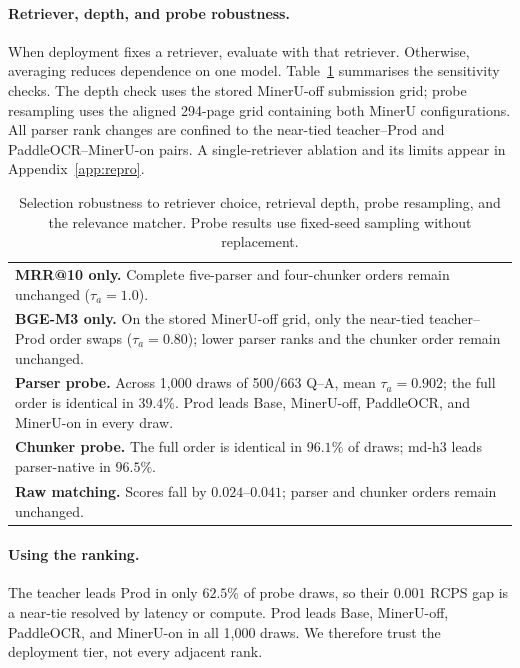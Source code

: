 \documentclass[11pt]{article}
\newcommand{\rcps}{\textnormal{\textsc{RCPS}}}
\begin{document}
\paragraph{Retriever, depth, and probe robustness.} When deployment fixes a retriever, evaluate with that retriever. Otherwise, averaging reduces dependence on one model. Table~\ref{tab:robustness-summary} summarises the sensitivity checks. The depth check uses the stored MinerU-off submission grid; probe resampling uses the aligned 294-page grid containing both MinerU configurations. All parser rank changes are confined to the near-tied teacher--Prod and PaddleOCR--MinerU-on pairs. A single-retriever ablation and its limits appear in Appendix~\ref{app:repro}.

\begin{table}[t]
\centering\footnotesize
\setlength{\tabcolsep}{5pt}
\begin{tabular}{p{}}
\toprule
\textbf{MRR@10 only.} Complete five-parser and four-chunker orders remain unchanged ($\tau_a=1.0$). \\
\textbf{BGE-M3 only.} On the stored MinerU-off grid, only the near-tied teacher--Prod order swaps ($\tau_a=0.80$); lower parser ranks and the chunker order remain unchanged. \\
\textbf{Parser probe.} Across 1{,}000 draws of 500/663 Q--A, mean $\tau_a=0.902$; the full order is identical in $39.4\%$. Prod leads Base, MinerU-off, PaddleOCR, and MinerU-on in every draw. \\
\textbf{Chunker probe.} The full order is identical in $96.1\%$ of draws; md-h3 leads parser-native in $96.5\%$. \\
\textbf{Raw matching.} Scores fall by $0.024$--$0.041$; parser and chunker orders remain unchanged. \\
\bottomrule
\end{tabular}
\caption{Selection robustness to retriever choice, retrieval depth, probe resampling, and the relevance matcher. Probe results use fixed-seed sampling without replacement.}
\label{tab:robustness-summary}
\end{table}

\paragraph{Using the ranking.} The teacher leads Prod in only $62.5\%$ of probe draws, so their $0.001$ \rcps{} gap is a near-tie resolved by latency or compute. Prod leads Base, MinerU-off, PaddleOCR, and MinerU-on in all 1{,}000 draws. We therefore trust the deployment tier, not every adjacent rank.
\end{document}
